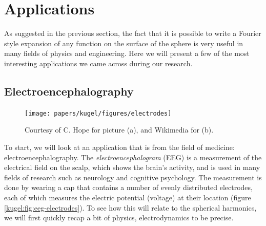 
\section{Applications}

As suggested in the previous section, the fact that it is possible to write a
Fourier style expansion of any function on the surface of the sphere is very
useful in many fields of physics and engineering. Here we will present a few of
the most interesting applications we came across during our research.

\subsection{Electroencephalography}

\begin{figure}
  \centering
    {\texttt{[image: papers/kugel/figures/electrodes]}}
  \qquad
  \caption{
    Courtesy of C. Hope \cite{sheerman-chase_volunteer_2012} for picture (a),
    and Wikimedia \cite{maschen_english_2013} for (b).
    \label{kugel:fig:eeg}
  }
\end{figure}

To start, we will look at an application that is from the field of medicine:
electroencephalography. The \emph{electroencephalogram} (EEG) is a measurement
of the electrical field on the scalp, which shows the brain's activity, and is
used in many fields of research such as neurology and cognitive psychology.  The
measurement is done by wearing a cap that contains a number of evenly
distributed electrodes, each of which measures the electric potential (voltage)
at their location (figure \ref{kugel:fig:eeg-electrodes}).  To see how this will
relate to the spherical harmonics, we will first quickly recap a bit of physics,
electrodynamics to be precise.

